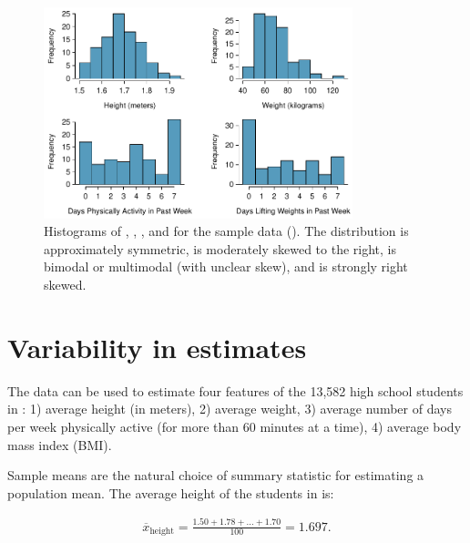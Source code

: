 \begin{spacing}{1.5}
\begin{figure}
\centering
\includegraphics[width=0.8\textwidth]
{ch_inference_foundations_oi_biostat/figures/yrbssSampHistograms/yrbssSampHistograms} 
\caption{Histograms of , , , and  for the sample data (). The  distribution is approximately symmetric,  is moderately skewed to the right,  is bimodal or multimodal (with unclear skew), and  is strongly right skewed.}
\label{yrbssSampHistograms}
\end{figure}

\section[Variability in estimates]{Variability in estimates} %
\label{variabilityInEstimates}


The  data can be used to estimate four features of the 13,582 high school students in : 1) average height (in meters), 2) average weight, 3) average number of days per week physically active (for more than 60 minutes at a time), 4) average body mass index (BMI).

Sample means are the natural choice of summary statistic for estimating a population mean. The average height of the students in  is:

\begin{align*}
\overline{x}_{\text{height}} = \frac{1.50 + 1.78 + \dots + 1.70}{100} = 1.697.
\end{align*}


\end{spacing}
